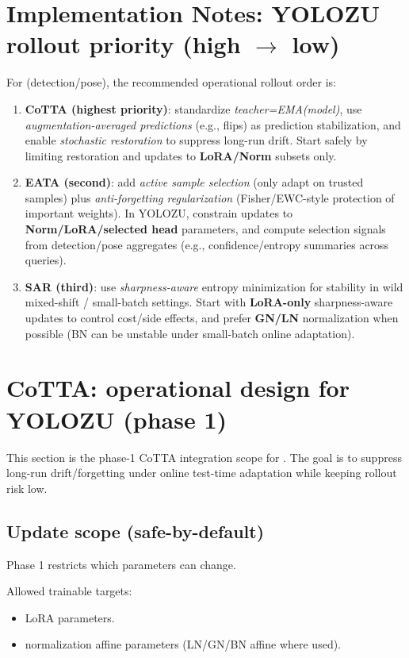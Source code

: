 \section{Implementation Notes: YOLOZU rollout priority (high \texorpdfstring{$\to$}{->} low)}
For \yolozu{} (detection/pose), the recommended operational rollout order is:
\begin{enumerate}
  \item \textbf{CoTTA (highest priority)}: standardize \emph{teacher=EMA(model)}, use \emph{augmentation-averaged predictions} (e.g., flips) as prediction stabilization, and enable \emph{stochastic restoration} to suppress long-run drift.
  Start safely by limiting restoration and updates to \textbf{LoRA/Norm} subsets only.
  \item \textbf{EATA (second)}: add \emph{active sample selection} (only adapt on trusted samples) plus \emph{anti-forgetting regularization} (Fisher/EWC-style protection of important weights).
  In YOLOZU, constrain updates to \textbf{Norm/LoRA/selected head} parameters, and compute selection signals from detection/pose aggregates (e.g., confidence/entropy summaries across queries).
  \item \textbf{SAR (third)}: use \emph{sharpness-aware} entropy minimization for stability in wild mixed-shift / small-batch settings.
  Start with \textbf{LoRA-only} sharpness-aware updates to control cost/side effects, and prefer \textbf{GN/LN} normalization when possible (BN can be unstable under small-batch online adaptation).
\end{enumerate}

\section{CoTTA: operational design for YOLOZU (phase 1)}
This section is the phase-1 CoTTA integration scope for \yolozu{}.
The goal is to suppress long-run drift/forgetting under online test-time adaptation while keeping rollout risk low.

\subsection{Update scope (safe-by-default)}
Phase 1 restricts which parameters can change.

Allowed trainable targets:
\begin{itemize}
  \item LoRA parameters.
  \item normalization affine parameters (LN/GN/BN affine where used).
\end{itemize}

